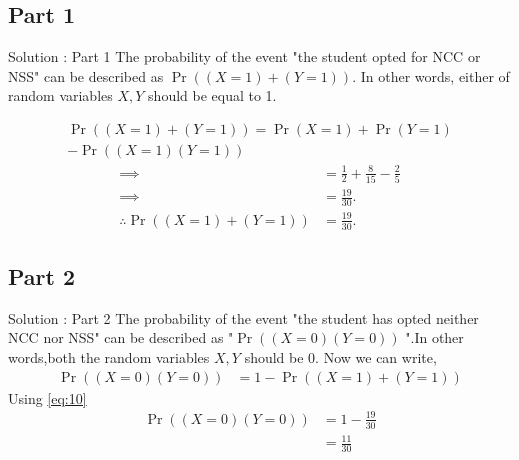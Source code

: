 \documentclass{beamer}
\providecommand{\pr}[1]{\ensuremath{\Pr\left(#1\right)}}
\providecommand{\brak}[1]{\ensuremath{\left(#1\right)}}
\begin{document}
\subsection{Part 1}
     
\begin{frame}{Solution : Part 1}
      The probability of the event "the student opted for NCC or NSS" can be described as $\pr{\brak{X = 1} + \brak{Y = 1}}$. In other words, either of random variables $X,Y$ should be equal to 1.
                  
          \begin{equation}
            \begin{split}
                \pr{\brak{X = 1} + \brak{Y = 1}} = \pr{X=1}+\pr{Y=1}\\
                                                       -\pr{\brak{X = 1}\brak{Y=1}}
            \end{split}
          \end{equation}
          \begin{align}
             \implies      &= \frac{1}{2} + \frac{8}{15}  - \frac{2}{5}\\
             \implies      &= \frac{19}{30}.\\
             \therefore \pr{\brak{X = 1} + \brak{Y = 1}} &= \frac{19}{30}.\label{eq:10}
          \end{align}
\end{frame} 
\subsection{Part 2}

\begin{frame}{Solution : Part 2}
       The probability of the event "the student has opted neither NCC nor NSS" can be described as "$ \pr{\brak{X=0}\brak{Y=0}}$ ".In other words,both the random variables $X,Y$ should be 0.  
                 Now we can write,
          \begin{align}
                  \pr{\brak{X=0}\brak{Y=0}} &= 1 - \pr{\brak{X = 1} + \brak{Y = 1}}
          \end{align}
                Using \eqref{eq:10}
          \begin{align}
	          \pr{\brak{X=0}\brak{Y=0}} &= 1 - \frac{19}{30}\\
                                            &= \frac{11}{30}                        
          \end{align}
\end{frame}
\end{document}
